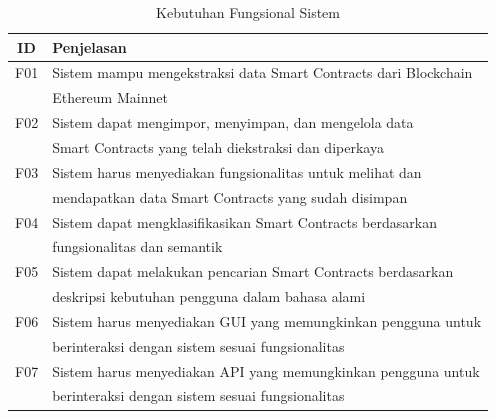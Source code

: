 \begin{table}[h]
	\caption{Kebutuhan Fungsional Sistem}
	\vspace{0.25cm}
	\begin{center}
		\begin{tabular}{|c|l|}
			\hline
			\textbf{ID} & \textbf{Penjelasan} \\ \hline
			F01 & Sistem mampu mengekstraksi data Smart Contracts dari Blockchain \\ & Ethereum Mainnet \\ \hline
			F02 & Sistem dapat mengimpor, menyimpan, dan mengelola data \\ & Smart Contracts yang telah diekstraksi dan diperkaya  \\ \hline
			F03 & Sistem harus menyediakan fungsionalitas untuk melihat dan \\ & mendapatkan data Smart Contracts yang sudah disimpan  \\ \hline
			F04 & Sistem dapat mengklasifikasikan Smart Contracts berdasarkan \\ & fungsionalitas dan semantik \\ \hline
			F05 & Sistem dapat melakukan pencarian Smart Contracts berdasarkan \\ & deskripsi kebutuhan pengguna dalam bahasa alami \\ \hline
			F06 & Sistem harus menyediakan GUI yang memungkinkan pengguna untuk \\ & berinteraksi dengan sistem sesuai fungsionalitas \\ \hline
			F07 & Sistem harus menyediakan API yang memungkinkan pengguna untuk \\ & berinteraksi dengan sistem sesuai fungsionalitas \\ \hline
		\end{tabular}
	\end{center}
\end{table}


